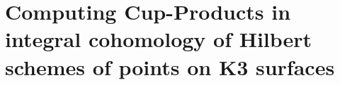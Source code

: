 \documentclass[letterpaper]{amsart}
\begin{document}
\part{Computing Cup-Products in integral cohomology of Hilbert schemes of points on K3 surfaces}



\appendix


\newpage

\newpage

\end{document}
